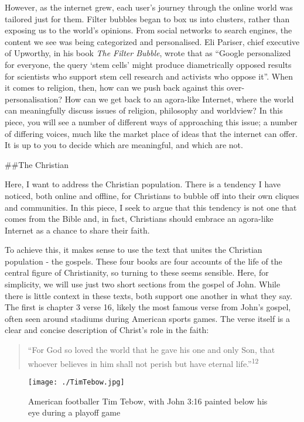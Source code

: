 \documentclass[]{article}
\begin{document}
However, as the internet grew, each user's journey through the online
world was tailored just for them. Filter bubbles began to box us into
clusters, rather than exposing us to the world's opinions. From social
networks to search engines, the content we see was being categorized and
personalised. Eli Pariser, chief executive of Upworthy, in his book
\emph{The Filter Bubble}, wrote that as ``Google personalized for
everyone, the query `stem cells' might produce diametrically opposed
results for scientists who support stem cell research and activists who
oppose it''\autocite[pg 2]{PariserFilterBubblewhat2012}. When it comes
to religion, then, how can we push back against this
over-personalisation? How can we get back to an agora-like Internet,
where the world can meaningfully discuss issues of religion, philosophy
and worldview? In this piece, you will see a number of different ways of
approaching this issue; a number of differing voices, much like the
market place of ideas that the internet can offer. It is up to you to
decide which are meaningful, and which are not.

\#\#The Christian

Here, I want to address the Christian population. There is a tendency I
have noticed, both online and offline, for Christians to bubble off into
their own cliques and communities. In this piece, I seek to argue that
this tendency is not one that comes from the Bible and, in fact,
Christians should embrace an agora-like Internet as a chance to share
their faith.

To achieve this, it makes sense to use the text that unites the
Christian population - the gospels. These four books are four accounts
of the life of the central figure of Christianity, so turning to these
seems sensible. Here, for simplicity, we will use just two short
sections from the gospel of John. While there is little context in these
texts, both support one another in what they say. The first is chapter 3
verse 16, likely the most famous verse from John's gospel, often seen
around stadiums during American sports games. The verse itself is a
clear and concise description of Christ's role in the faith:

\begin{quote}
``For God so loved the world that he gave his one and only Son, that
whoever believes in him shall not perish but have eternal
life.''\textsuperscript{12}
\end{quote}

\begin{figure}
\centering
\texttt{[image: ./TimTebow.jpg]}
\caption{American footballer Tim Tebow, with John 3:16 painted below his
eye during a playoff game}
\end{figure}
\end{document}
